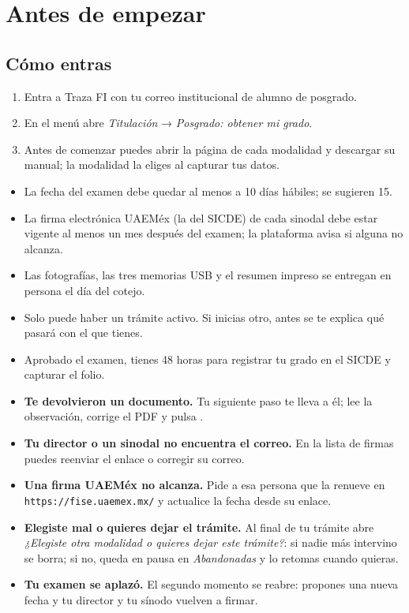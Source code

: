 \section{Antes de empezar}
\subsection*{Cómo entras}
\begin{enumerate}
  \item Entra a Traza FI con tu correo institucional de alumno de posgrado.
  \item En el menú abre \emph{Titulación} → \emph{Posgrado: obtener mi grado}.
  \item Antes de comenzar puedes abrir la página de cada modalidad y descargar su manual; la modalidad la eliges al capturar tus datos.
\end{enumerate}
\begin{tencuenta}
\begin{itemize}
  \item La fecha del examen debe quedar al menos a 10 días hábiles; se sugieren 15.
  \item La firma electrónica UAEMéx (la del SICDE) de cada sinodal debe estar vigente al menos un mes después del examen; la plataforma avisa si alguna no alcanza.
  \item Las fotografías, las tres memorias USB y el resumen impreso se entregan en persona el día del cotejo.
  \item Solo puede haber un trámite activo. Si inicias otro, antes se te explica qué pasará con el que tienes.
  \item Aprobado el examen, tienes 48 horas para registrar tu grado en el SICDE y capturar el folio.
\end{itemize}
\end{tencuenta}
\begin{algosalemal}
\begin{itemize}
  \item \textbf{Te devolvieron un documento.} Tu siguiente paso te lleva a él; lee la observación, corrige el PDF y pulsa .
  \item \textbf{Tu director o un sinodal no encuentra el correo.} En la lista de firmas puedes reenviar el enlace o corregir su correo.
  \item \textbf{Una firma UAEMéx no alcanza.} Pide a esa persona que la renueve en \texttt{https://fise.uaemex.mx/} y actualice la fecha desde su enlace.
  \item \textbf{Elegiste mal o quieres dejar el trámite.} Al final de tu trámite abre \emph{¿Elegiste otra modalidad o quieres dejar este trámite?}: si nadie más intervino se borra; si no, queda en pausa en \emph{Abandonadas} y lo retomas cuando quieras.
  \item \textbf{Tu examen se aplazó.} El segundo momento se reabre: propones una nueva fecha y tu director y tu sínodo vuelven a firmar.
\end{itemize}
\end{algosalemal}
